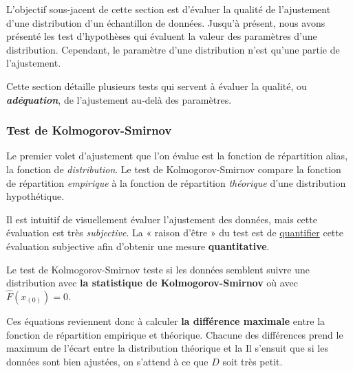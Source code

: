 \documentclass[french]{article}
\begin{document}
\begin{multicols*}{2}
\begin{rappel_enhanced}[Contexte]
L'objectif sous-jacent de cette section est d'évaluer la qualité de l'ajustement d'une distribution d'un échantillon de données. Jusqu'à présent, nous avons présenté les test d'hypothèses qui évaluent la valeur des paramètres d'une distribution. Cependant, le paramètre d'une distribution n'est qu'une partie de l'ajustement.  

\bigskip

Cette section détaille plusieurs tests qui servent à évaluer la qualité, ou \textbf{\textit{adéquation}}, de l'ajustement au-delà des paramètres. 
\end{rappel_enhanced}

\subsubsection{Test de Kolmogorov-Smirnov}
\begin{rappel_enhanced}[Motivation] 
Le premier volet d'ajustement que l'on évalue est la fonction de répartition alias, la fonction de \textit{distribution}. Le test de Kolmogorov-Smirnov compare la fonction de répartition \textit{empirique} à la fonction de répartition \textit{théorique} d'une distribution hypothétique.

\bigskip

Il est intuitif de visuellement évaluer l'ajustement des données, mais cette évaluation est très \textit{subjective}. La « raison d'être » du test est de \underline{quantifier} cette évaluation subjective afin d'obtenir une mesure \textbf{quantitative}. 
\end{rappel_enhanced}


\begin{definitionNOHFILL}
Le test de Kolmogorov-Smirnov teste si les données semblent suivre une distribution avec \textbf{la statistique de Kolmogorov-Smirnov}  où  avec $\hat{F}(x_{(0)}) = 0$.

\bigskip

Ces équations reviennent donc à calculer \textbf{la différence maximale} entre la fonction de répartition empirique et théorique. Chacune des différences prend le maximum de l'écart entre la distribution théorique et la 
Il s'ensuit que si les données sont bien ajustées, on s'attend à ce que $D$ soit très petit.


\end{definitionNOHFILL}
\end{multicols*}
\end{document}
